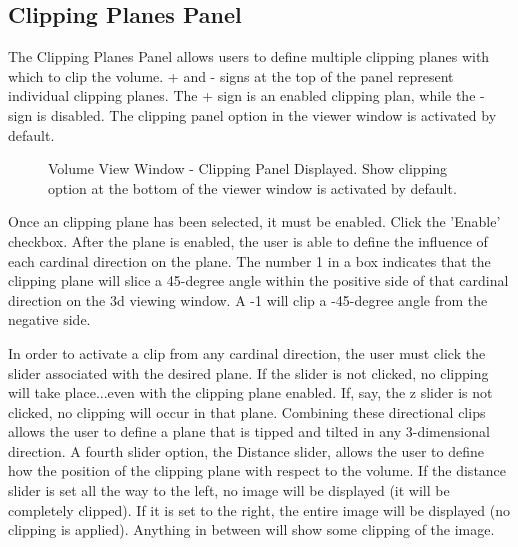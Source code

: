\documentclass[fleqn,11pt,openany]{book}
\begin{document}
\subsection{Clipping Planes Panel}
\label{sec:clipping}
The Clipping Planes Panel allows users to define multiple clipping planes with which to clip the volume.  
+ and - signs at the top of the panel represent individual clipping planes.  
The + sign is an enabled clipping plan, while the - sign is disabled.
The clipping panel option in the viewer window is activated by default.

\begin{figure}[b!]
\caption{Volume View Window - Clipping Panel Displayed. Show clipping option at the bottom of the viewer window is activated by default.}\label{fig:ClippingPanel}
\end{figure}

Once an clipping plane has been selected, it must be enabled.  Click the 'Enable' checkbox.  
After the plane is enabled, the user is able to define the influence of each cardinal direction on the plane.  
The number 1 in a box indicates that the clipping plane will slice a 45-degree angle within the positive side of that cardinal direction on the 3d viewing window. 
A -1 will clip a -45-degree angle from the negative side.

In order to activate a clip from any cardinal direction, the user must click the slider associated with the desired plane.
If the slider is not clicked, no clipping will take place...even with the clipping plane enabled.
If, say, the z slider is not clicked, no clipping will occur in that plane.
Combining these directional clips allows the user to define a plane that is tipped and tilted in any 3-dimensional direction.
A fourth slider option, the Distance slider, allows the user to define how the position of the clipping plane with respect to the volume.  
If the distance slider is set all the way to the left, no image will be displayed (it will be completely clipped).
If it is set to the right, the entire image will be displayed (no clipping is applied).  
Anything in between will show some clipping of the image.
\end{document}
